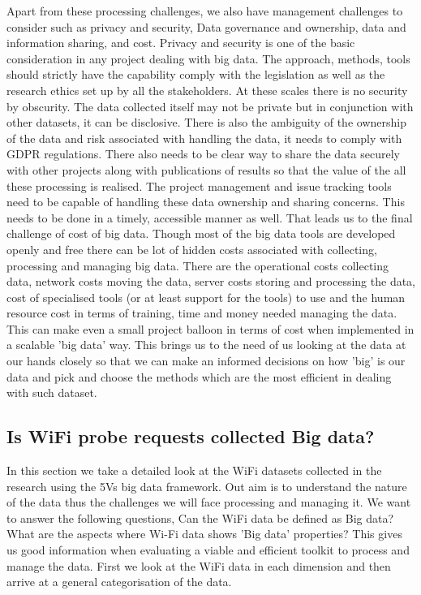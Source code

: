 Apart from these processing challenges, we also have management challenges to consider such as privacy and security, Data governance and ownership, data and information sharing, and cost.
Privacy and security is one of the basic consideration in any project dealing with big data.
The approach, methods, tools should strictly have the capability comply with the legislation as well as the research ethics set up by all the stakeholders.
At these scales there is no security by obscurity.
The data collected itself may not be private but in conjunction with other datasets, it can be disclosive.
There is also the ambiguity of the ownership of the data and risk associated with handling the data, it needs to comply with GDPR regulations.
There also needs to be clear way to share the data securely with other projects along with publications of results so that the value of the all these processing is realised.
The project management and issue tracking tools need to be capable of handling these data ownership and sharing concerns.
This needs to be done in a timely, accessible manner as well.
That leads us to the final challenge of cost of big data.
Though most of the big data tools are developed openly and free there can be lot of hidden costs associated with collecting, processing and managing big data.
There are the operational costs collecting data, network costs moving the data, server costs storing and processing the data, cost of specialised tools (or at least support for the tools) to use and the human resource cost in terms of training, time and money needed managing the data.
This can make even a small project balloon in terms of cost when implemented in a scalable 'big data' way.
This brings us to the need of us looking at the data at our hands closely so that we can make an informed decisions on how 'big' is our data and pick and choose the methods which are the most efficient in dealing with such dataset.

\subsection{Is WiFi probe requests collected Big data?}

In this section we take a detailed look at the WiFi datasets collected in the research using the 5Vs big data framework.
Out aim is to understand the nature of the data thus the challenges we will face processing and managing it.
We want to answer the following questions,
Can the WiFi data be defined as Big data?
What are the aspects where Wi-Fi data shows 'Big data' properties?
This gives us good information when evaluating a viable and efficient toolkit to process and manage the data.
First we look at the WiFi data in each dimension and then arrive at a general categorisation of the data.

